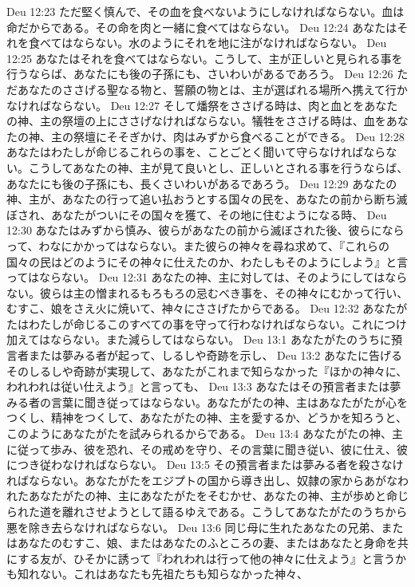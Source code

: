Deu 12:23  ただ堅く慎んで、その血を食べないようにしなければならない。血は命だからである。その命を肉と一緒に食べてはならない。
Deu 12:24  あなたはそれを食べてはならない。水のようにそれを地に注がなければならない。
Deu 12:25  あなたはそれを食べてはならない。こうして、主が正しいと見られる事を行うならば、あなたにも後の子孫にも、さいわいがあるであろう。
Deu 12:26  ただあなたのささげる聖なる物と、誓願の物とは、主が選ばれる場所へ携えて行かなければならない。
Deu 12:27  そして燔祭をささげる時は、肉と血とをあなたの神、主の祭壇の上にささげなければならない。犠牲をささげる時は、血をあなたの神、主の祭壇にそそぎかけ、肉はみずから食べることができる。
Deu 12:28  あなたはわたしが命じるこれらの事を、ことごとく聞いて守らなければならない。こうしてあなたの神、主が見て良いとし、正しいとされる事を行うならば、あなたにも後の子孫にも、長くさいわいがあるであろう。
Deu 12:29  あなたの神、主が、あなたの行って追い払おうとする国々の民を、あなたの前から断ち滅ぼされ、あなたがついにその国々を獲て、その地に住むようになる時、
Deu 12:30  あなたはみずから慎み、彼らがあなたの前から滅ぼされた後、彼らにならって、わなにかかってはならない。また彼らの神々を尋ね求めて、『これらの国々の民はどのようにその神々に仕えたのか、わたしもそのようにしよう』と言ってはならない。
Deu 12:31  あなたの神、主に対しては、そのようにしてはならない。彼らは主の憎まれるもろもろの忌むべき事を、その神々にむかって行い、むすこ、娘をさえ火に焼いて、神々にささげたからである。
Deu 12:32  あなたがたはわたしが命じるこのすべての事を守って行わなければならない。これにつけ加えてはならない。また減らしてはならない。
Deu 13:1  あなたがたのうちに預言者または夢みる者が起って、しるしや奇跡を示し、
Deu 13:2  あなたに告げるそのしるしや奇跡が実現して、あなたがこれまで知らなかった『ほかの神々に、われわれは従い仕えよう』と言っても、
Deu 13:3  あなたはその預言者または夢みる者の言葉に聞き従ってはならない。あなたがたの神、主はあなたがたが心をつくし、精神をつくして、あなたがたの神、主を愛するか、どうかを知ろうと、このようにあなたがたを試みられるからである。
Deu 13:4  あなたがたの神、主に従って歩み、彼を恐れ、その戒めを守り、その言葉に聞き従い、彼に仕え、彼につき従わなければならない。
Deu 13:5  その預言者または夢みる者を殺さなければならない。あなたがたをエジプトの国から導き出し、奴隷の家からあがなわれたあなたがたの神、主にあなたがたをそむかせ、あなたの神、主が歩めと命じられた道を離れさせようとして語るゆえである。こうしてあなたがたのうちから悪を除き去らなければならない。
Deu 13:6  同じ母に生れたあなたの兄弟、またはあなたのむすこ、娘、またはあなたのふところの妻、またはあなたと身命を共にする友が、ひそかに誘って『われわれは行って他の神々に仕えよう』と言うかも知れない。これはあなたも先祖たちも知らなかった神々、
